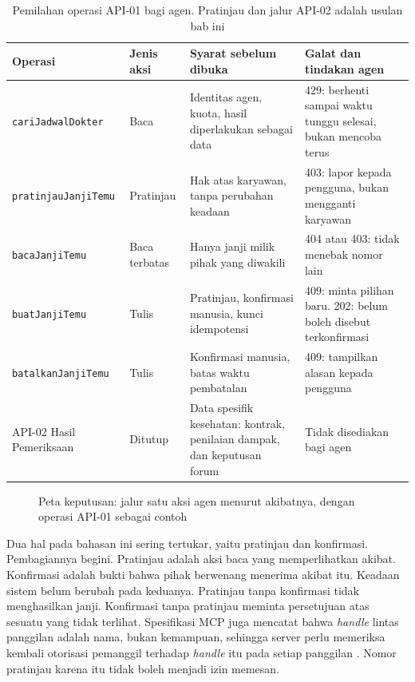 \begin{table}[!htb]
  \centering
  \caption{Pemilahan operasi API-01 bagi agen. Pratinjau dan jalur API-02 adalah usulan bab ini}
  \label{tab:ch14-operasi}
  \footnotesize
  \begin{tabularx}{\textwidth}{H{3.15cm}H{1.5cm}GG}
    \hline
    \textbf{Operasi} & \textbf{Jenis aksi} & \textbf{Syarat sebelum dibuka} & \textbf{Galat dan tindakan agen} \\ \hline
    \texttt{cariJadwalDokter} & Baca & Identitas agen, kuota, hasil diperlakukan sebagai data & 429: berhenti sampai waktu tunggu selesai, bukan mencoba terus \\ \hline
    \texttt{pratinjauJanjiTemu} & Pratinjau & Hak atas karyawan, tanpa perubahan keadaan & 403: lapor kepada pengguna, bukan mengganti karyawan \\ \hline
    \texttt{bacaJanjiTemu} & Baca terbatas & Hanya janji milik pihak yang diwakili & 404 atau 403: tidak menebak nomor lain \\ \hline
    \texttt{buatJanjiTemu} & Tulis & Pratinjau, konfirmasi manusia, kunci idempotensi & 409: minta pilihan baru. 202: belum boleh disebut terkonfirmasi \\ \hline
    \texttt{batalkanJanjiTemu} & Tulis & Konfirmasi manusia, batas waktu pembatalan & 409: tampilkan alasan kepada pengguna \\ \hline
    API-02 Hasil Pemeriksaan & Ditutup & Data spesifik kesehatan: kontrak, penilaian dampak, dan keputusan forum & Tidak disediakan bagi agen \\ \hline
  \end{tabularx}
\end{table}

\begin{figure}[!htb]
  \centering
  \resizebox{\textwidth}{!}{}
  \caption{Peta keputusan: jalur satu aksi agen menurut akibatnya, dengan operasi API-01 sebagai contoh}
  \label{fig:ch14-peta-keputusan}
\end{figure}

Dua hal pada bahasan ini sering tertukar, yaitu pratinjau dan konfirmasi. Pembagiannya begini. Pratinjau adalah aksi baca yang memperlihatkan akibat. Konfirmasi adalah bukti
bahwa pihak berwenang menerima akibat itu. Keadaan sistem belum berubah pada keduanya. Pratinjau tanpa konfirmasi tidak menghasilkan janji. Konfirmasi tanpa pratinjau meminta
persetujuan atas sesuatu yang tidak terlihat. Spesifikasi MCP juga mencatat bahwa \textit{handle} lintas panggilan adalah nama, bukan kemampuan, sehingga server perlu memeriksa
kembali otorisasi pemanggil terhadap \textit{handle} itu pada setiap panggilan \cite{c14-mcp-tools}. Nomor pratinjau karena itu tidak boleh menjadi izin memesan.

